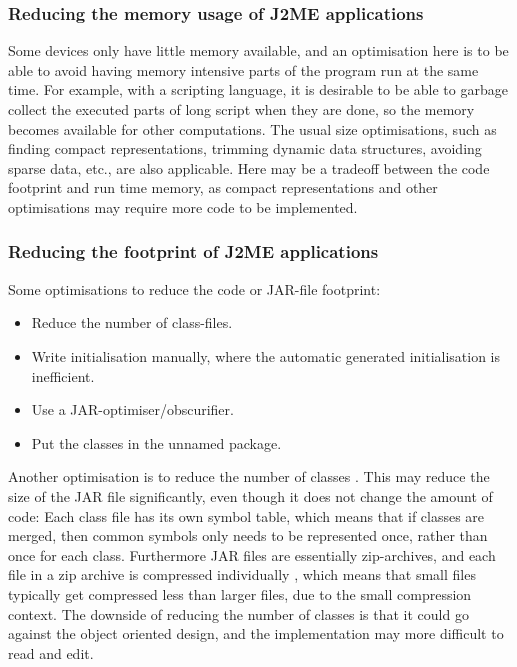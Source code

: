 \documentclass[11pt]{report}
\begin{document}
\subsubsection{Reducing the memory usage of J2ME applications}

Some devices only have little memory available,
and an optimisation here is to be able to avoid having memory intensive parts of the program run at the same time. For example, with a scripting language, it is desirable to be able to garbage collect the executed parts of long script when they are done, so the memory becomes available for other computations.
The usual size optimisations, such as finding compact representations, trimming dynamic data structures, avoiding sparse data, etc., are also applicable.
Here may be a tradeoff between the code footprint and run time memory, as compact representations and other optimisations may require more code to be implemented.

\subsubsection{Reducing the footprint of J2ME applications}
Some optimisations to reduce the code or JAR-file footprint:
\begin{itemize}
\item Reduce the number of class-files.
\item Write initialisation manually, where the automatic generated initialisation is inefficient.
\item Use a JAR-optimiser/obscurifier.
\item Put the classes in the unnamed package.
\end{itemize}

Another optimisation is to reduce the number of classes \cite{nokia-optim, kahlua-thesis}.
This may reduce the size of the JAR file significantly,
even though it does not change the amount of code:
Each class file has its own symbol table, which means that if classes are merged, then common symbols only needs to be represented once, rather than once for each class.
Furthermore JAR files are essentially zip-archives, and each file in a zip archive is compressed individually \cite{zipspec}, which means that small files typically get compressed less than larger files, due to the small compression context.
The downside of reducing the number of classes is that it could go against the object oriented design, and the implementation may more difficult to read and edit.
\end{document}
